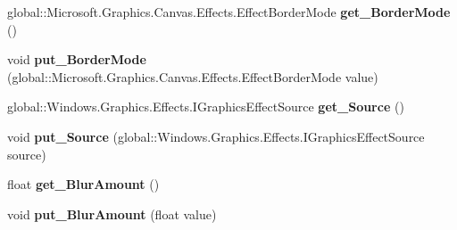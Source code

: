 \begin{DoxyCompactItemize}
\item 
\mbox{\label{interface_microsoft_1_1_graphics_1_1_canvas_1_1_effects_1_1_i_directional_blur_effect_a74efbf96cb636f056a89880c63859cd8}} 
global\+::\+Microsoft.\+Graphics.\+Canvas.\+Effects.\+Effect\+Border\+Mode {\bfseries get\+\_\+\+Border\+Mode} ()
\item 
\mbox{\label{interface_microsoft_1_1_graphics_1_1_canvas_1_1_effects_1_1_i_directional_blur_effect_a826a5452cf6d53f023b716ce8307b270}} 
void {\bfseries put\+\_\+\+Border\+Mode} (global\+::\+Microsoft.\+Graphics.\+Canvas.\+Effects.\+Effect\+Border\+Mode value)
\item 
\mbox{\label{interface_microsoft_1_1_graphics_1_1_canvas_1_1_effects_1_1_i_directional_blur_effect_a4bd130580cbba798a3932118c6be8047}} 
global\+::\+Windows.\+Graphics.\+Effects.\+I\+Graphics\+Effect\+Source {\bfseries get\+\_\+\+Source} ()
\item 
\mbox{\label{interface_microsoft_1_1_graphics_1_1_canvas_1_1_effects_1_1_i_directional_blur_effect_a2ac36071af70289687b3c9a8a77dcf46}} 
void {\bfseries put\+\_\+\+Source} (global\+::\+Windows.\+Graphics.\+Effects.\+I\+Graphics\+Effect\+Source source)
\item 
\mbox{\label{interface_microsoft_1_1_graphics_1_1_canvas_1_1_effects_1_1_i_directional_blur_effect_a4678a1fcff40d964531dcc8bec2c2623}} 
float {\bfseries get\+\_\+\+Blur\+Amount} ()
\item 
\mbox{\label{interface_microsoft_1_1_graphics_1_1_canvas_1_1_effects_1_1_i_directional_blur_effect_ab5a1c0e6691e6caf3350123e055c9cc2}} 
void {\bfseries put\+\_\+\+Blur\+Amount} (float value)
\item 
\mbox{\label{interface_microsoft_1_1_graphics_1_1_canvas_1_1_effects_1_1_i_directional_blur_effect_ad5925e9f76f210acd008a4877fb9e527}} 

\end{DoxyCompactItemize}
